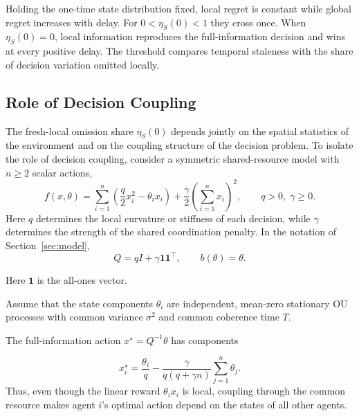 \documentclass[11pt]{article}
\begin{document}
Holding the one-time state distribution fixed, local regret is constant while
global regret increases with delay. For $0<\eta_S(0)<1$ they cross once.
When $\eta_S(0)=0$, local information reproduces the full-information decision
and wins at every positive delay. The threshold compares temporal staleness
with the share of decision variation omitted locally.

\subsection{Role of Decision Coupling}
\label{subsec:coupling_example}

The fresh-local omission share $\eta_S(0)$ depends jointly on the
spatial statistics of the environment and on the coupling structure of the
decision problem. To isolate the role of decision coupling, consider a
symmetric shared-resource model with $n\ge2$ scalar actions,
\begin{equation}
    f(x,\theta)
    =
    \sum_{i=1}^{n}
    \left(
        \frac{q}{2}x_i^2-\theta_i x_i
    \right)
    +
    \frac{\gamma}{2}
    \left(
        \sum_{i=1}^{n}x_i
    \right)^2,
    \qquad
    q>0,\;\gamma\ge0.
    \label{eq:shared_resource_cost}
\end{equation}
Here $q$ determines the local curvature or stiffness of each decision, while
$\gamma$ determines the strength of the shared coordination penalty. In the
notation of Section~\ref{sec:model},
\begin{equation}
    Q
    =
    qI+\gamma\mathbf{1}\mathbf{1}^\top,
    \qquad
    b(\theta)=\theta.
    \label{eq:shared_resource_Q}
\end{equation}

Here $\mathbf1$ is the all-ones vector.

Assume that the state components $\theta_i$ are independent, mean-zero
stationary OU processes with common variance $\sigma^2$ and common coherence
time $T$.

The full-information action $x^\star=Q^{-1}\theta$ has components

\begin{equation}
    x_i^\star
    =
    \frac{\theta_i}{q}
    -
    \frac{\gamma}
    {q(q+\gamma n)}
    \sum_{j=1}^{n}\theta_j.
    \label{eq:shared_resource_xstar}
\end{equation}
Thus, even though the linear reward $\theta_i x_i$ is local, coupling through
the common resource makes agent $i$'s optimal action depend on the states of
all other agents.
\end{document}
